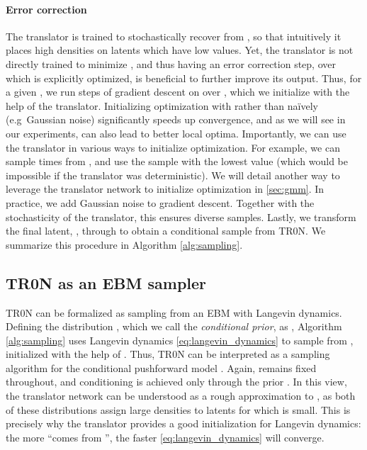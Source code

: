 \documentclass[nohyperref]{article}
\theoremstyle{plain}
\theoremstyle{definition}
\theoremstyle{remark}
\begin{document}
\paragraph{Error correction} The translator is trained to stochastically recover  from , so that intuitively it places high densities on latents which have low  values. Yet, the translator is not directly trained to minimize , and thus having an error correction step, over which  is explicitly optimized, is beneficial to further improve its output. Thus, for a given , we run  steps of gradient descent on  over , which we initialize with the help of the translator. Initializing optimization with  rather than na\"ively (e.g\ Gaussian noise) significantly speeds up convergence, and as we will see in our experiments, can also lead to better local optima. Importantly, we can use the translator in various ways to initialize optimization. For example, we can sample  times from , and use the sample with the lowest  value (which would be impossible if the translator was deterministic). We will detail another way to leverage the translator network to initialize optimization in \autoref{sec:gmm}. In practice, we add Gaussian noise to gradient descent. Together with the stochasticity of the translator, this ensures diverse samples. Lastly, we transform the final latent, , through  to obtain a conditional sample from TR0N. We summarize this procedure in Algorithm \ref{alg:sampling}.


\subsection{TR0N as an EBM sampler}

TR0N can be formalized as sampling from an EBM with Langevin dynamics. Defining the distribution , which we call the \emph{conditional prior}, as , Algorithm \ref{alg:sampling} uses Langevin dynamics \eqref{eq:langevin_dynamics} to sample from , initialized with the help of . Thus, TR0N can be interpreted as a sampling algorithm for the conditional pushforward model . Again,  remains fixed throughout, and conditioning is achieved only through the prior . 
In this view, the translator network  can be understood as a rough approximation to , as both of these distributions assign large densities to latents  for which  is small. This is precisely why the translator provides a good initialization for Langevin dynamics: the more  ``comes from '', the faster \eqref{eq:langevin_dynamics} will converge.
\end{document}
